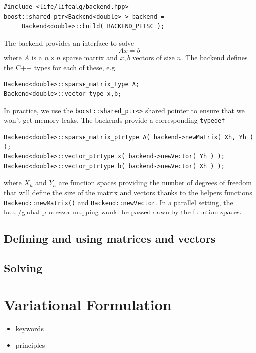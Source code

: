 \documentclass[a4paper]{book}
\newcommand{\cpp}{C{\hspace{-.3em}\vspace{-.2em}\tiny++}\xspace}
\begin{document}
\begin{lstlisting}
#include <life/lifealg/backend.hpp>
boost::shared_ptr<Backend<double> > backend =
     Backend<double>::build( BACKEND_PETSC );
\end{lstlisting}

The backend provides an interface to solve
\begin{equation}
  \label{eq:8}
  A x = b
\end{equation}
\noindent
where $A$ is a $n \times n $ sparse matrix and $x,b$ vectors of size $n$.
The backend defines the \cpp types for  each of these, e.g.
\begin{lstlisting}
Backend<double>::sparse_matrix_type A;
Backend<double>::vector_type x,b;
\end{lstlisting}
\noindent
In practice, we use the \lstinline!boost::shared_ptr<>! shared pointer
to ensure that we won't get memory leaks. The backends provide a
corresponding \lstinline!typedef!


\begin{lstlisting}
Backend<double>::sparse_matrix_ptrtype A( backend->newMatrix( Xh, Yh ) );
Backend<double>::vector_ptrtype x( backend->newVector( Yh ) );
Backend<double>::vector_ptrtype b( backend->newVector( Xh ) );
\end{lstlisting}
\noindent
where $X_h$ and $Y_h$ are function spaces providing the number of
degrees of freedom that will define the size of the matrix and vectors
thanks to the helpers functions \lstinline!Backend::newMatrix()! and
\lstinline!Backend::newVector!. In a parallel setting, the
local/global processor mapping would be passed down by the function
spaces.

\subsection{Defining and using matrices and vectors}
\label{sec:defin-using-matr}

\subsection{Solving}
\label{sec:solving}


\section{Variational Formulation}
\label{sec:vari-form}

\begin{itemize}
\item keywords
\item principles
\end{itemize}
\end{document}
